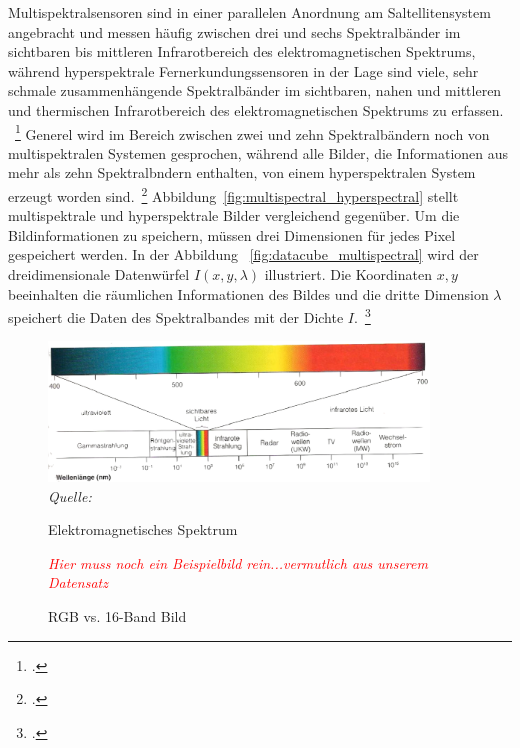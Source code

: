 Multispektralsensoren sind in einer parallelen Anordnung am Saltellitensystem angebracht und messen häufig zwischen drei
und sechs Spektralbänder im sichtbaren bis mittleren Infrarotbereich des elektromagnetischen Spektrums, während
hyperspektrale Fernerkundungssensoren in der Lage sind viele, sehr schmale zusammenhängende Spektralbänder im
sichtbaren, nahen und mittleren und thermischen Infrarotbereich des elektromagnetischen Spektrums zu erfassen.
~\footcite[\vglf][]{govender.2007}
Generel wird im Bereich zwischen zwei und zehn Spektralbändern noch von multispektralen Systemen gesprochen, während
alle Bilder, die Informationen aus mehr als zehn Spektralbndern enthalten, von einem hyperspektralen System erzeugt
worden sind.~\footcite[\vglf][]{ibraheem.2015}
Abbildung~\ref{fig:multispectral_hyperspectral} stellt multispektrale und hyperspektrale Bilder vergleichend gegenüber.
Um die Bildinformationen zu speichern, müssen drei Dimensionen für jedes Pixel gespeichert werden.
In der Abbildung ~\ref{fig:datacube_multispectral} wird der dreidimensionale Datenwürfel \(I(x,y,\lambda)\) illustriert.
Die Koordinaten \(x,y\) beeinhalten die räumlichen Informationen des Bildes und die dritte Dimension \(\lambda\)
speichert die Daten des Spektralbandes mit der Dichte \(I\).~\footcite[\vglf][]{ibraheem.2015}

\begin{figure}[H]
    \caption {Elektromagnetisches Spektrum}
    \label{fig:Spektrum}
    \includegraphics[width=0.9\textwidth]{abbildungen/spektralbaender.png}
    \\
    \textit{Quelle:~\cite[][]{ditzinger.2013}}
    \\
\end{figure}

\begin{figure}[H]
    \caption {RGB vs. 16-Band Bild}
    \label{fig:RGB_vs_16_Band}
    \textcolor{red}{\textit{Hier muss noch ein Beispielbild rein...vermutlich aus unserem Datensatz}}
    \\
\end{figure}

